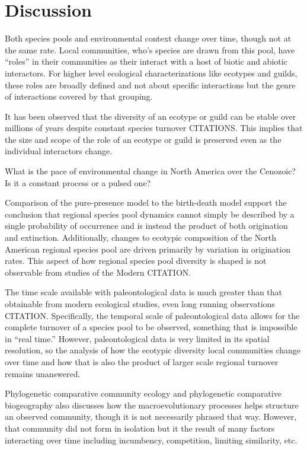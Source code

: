 \documentclass[12pt,letterpaper]{article}
\begin{document}
\section*{Discussion}

Both species pools and environmental context change over time, though not at the same rate. Local communities, who's species are drawn from this pool, have ``roles'' in their communities as their interact with a host of biotic and abiotic interactors. For higher level ecological characterizations like ecotypes and guilds, these roles are broadly defined and not about specific interactions but the genre of interactions covered by that grouping. 

It has been observed that the diversity of an ecotype or guild can be stable over millions of years despite constant species turnover \citep{Jernvall2004,Slater2015c} CITATIONS. This implies that the size and scope of the role of an ecotype or guild is preserved even as the individual interactors change.

What is the pace of environmental change in North America over the Cenozoic? Is it a constant process or a pulsed one?




Comparison of the pure-presence model to the birth-death model support the conclusion that regional species pool dynamics cannot simply be described by a single probability of occurrence and is instead the product of both origination and extinction. Additionally, changes to ecotypic composition of the North American regional species pool are driven primarily by variation in origination rates. This aspect of how regional species pool diversity is shaped is not observable from studies of the Modern CITATION.

The time scale available with paleontological data is much greater than that obtainable from modern ecological studies, even long running observations CITATION. Specifically, the temporal scale of paleontological data allows for the complete turnover of a species pool to be observed, something that is impossible in ``real time.'' However, paleontological data is very limited in its spatial resolution, so the analysis of how the ecotypic diversity local communities change over time and how that is also the product of larger scale regional turnover remains unanswered.

Phylogenetic comparative community ecology and phylogenetic comparative biogeography also discusses how the macroevolutionary processes helps structure an observed community, though it is not necessarily phrased that way. However, that community did not form in isolation but it the result of many factors interacting over time including incumbency, competition, limiting similarity, etc.
\end{document}

